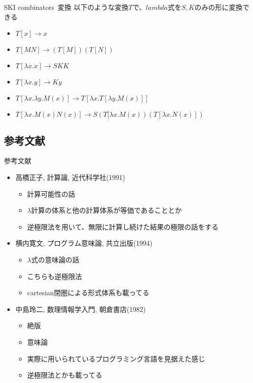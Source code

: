 \documentclass[pdflatex,17pt]{beamer}
\begin{document}
\begin{frame}{SKI combinators~変換}
    以下のような変換$T$で、$lambda$式を$S,K$のみの形に変換できる
    \begin{itemize}
        \item $T[x] \to x$
        \item $T[MN] \to (T[M])(T[N])$
        \item $T[\lambda x. x] \to SKK$
        \item $T[\lambda x. y] \to Ky$
        \item $T[\lambda x. \lambda y. M(x)] \to T[\lambda x. T[\lambda y. M(x)]]$
        \item $T[\lambda x. M(x)N(x)] \to S(T[\lambda x. M(x))(T[\lambda x. N(x)])$
    \end{itemize}
\end{frame}

\subsection{参考文献}
\begin{frame}{参考文献}
    \scriptsize
    \begin{itemize}
        \item 高橋正子, 計算論, 近代科学社(1991)
        \begin{itemize}
        \scriptsize
            \item 計算可能性の話
            \item $\lambda$計算の体系と他の計算体系が等価であることとか
            \item 逆極限法を用いて、無限に計算し続けた結果の極限の話をする
        \end{itemize}
        \item 横内寛文, プログラム意味論, 共立出版(1994)
        \begin{itemize}
        \scriptsize
            \item $\lambda$式の意味論の話
            \item こちらも逆極限法
            \item cartesian閉圏による形式体系も載ってる
        \end{itemize}
        \item 中島玲二, 数理情報学入門, 朝倉書店(1982)
        \begin{itemize}
        \scriptsize
            \item 絶版
            \item 意味論
            \item 実際に用いられているプログラミング言語を見据えた感じ
            \item 逆極限法とかも載ってる
        \end{itemize}
    \end{itemize}
\end{frame}
\end{document}

